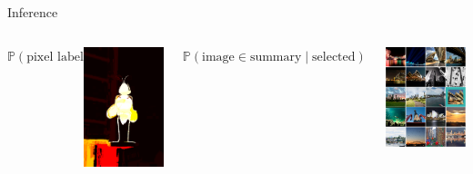\documentclass[mathserif]{beamer}
\begin{document}
\begin{frame}{Inference}
\vspace{1em}
\begin{columns}[c]
\centering
$\mathbb{P}(\textrm{pixel label})$

\vspace{0.7em}
\centering
\includegraphics[width=1.75in]{figures/bee_marginals.png}

\centering
$\mathbb{P}(\textrm{image} \in \textrm{summary} \mid \textrm{selected})$

\vspace{0.7em}
\centering
\includegraphics[width=1.75in]{figures/flickr_probs_1_1_portrait.png}
\vspace{2.85em}
\end{columns}
\end{frame}
\end{document}

